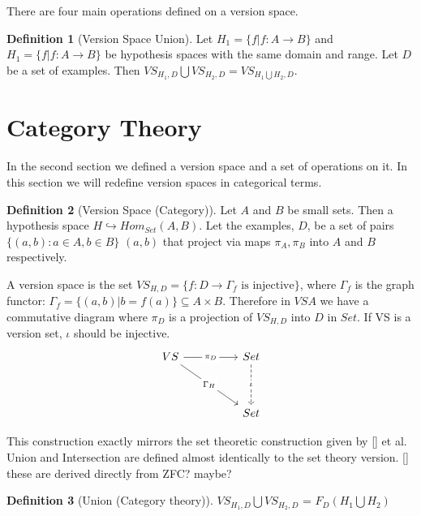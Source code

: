 \documentclass{article}
\theoremstyle{definition}
\newtheorem{definition}{Definition}[section]
\begin{document}
There are four main operations defined on a version space. 
\begin{definition}[Version Space Union]
    Let $H_1 = \{f | f: A \rightarrow B\}$ and $H_1 = \{f | f: A \rightarrow B\}$ be hypothesis spaces with the same domain and range. Let $D$ be a set of examples. Then $VS_{H_1, D} \bigcup VS_{H_2, D} = VS_{H_1\bigcup H_2, D}$. 
\end{definition}


\section{Category Theory}
In the second section we defined a version space and a set of operations on it. In this section we will redefine version spaces in categorical terms. 

\begin{definition}[Version Space (Category)]
Let $A$ and $B$ be small sets. Then a hypothesis space $H \hookrightarrow Hom_{Set}(A, B)$. Let the examples, $D$, be a set of pairs $\{(a,b) : a \in A, b \in B\}$ $(a,b)$ that project via maps $\pi_A, \pi_B$ into $A$ and $B$ respectively.

A version space is the set $VS_{H,D} = \{f : D \rightarrow \Gamma_f \text{ is injective}\}$, where $\Gamma_f$ is the graph functor: $\Gamma_f = \{(a,b) | b = f(a)\} \subseteq A\times B$. Therefore in $VSA$ we have a commutative diagram where $\pi_D$ is a projection of $VS_{H,D}$ into $D$ in $Set$. If VS is a version set, $\iota$ should be injective. 
\[\begin{tikzcd}
	{VS} && Set \\
	\\
	&& Set
	\arrow["{\pi_D}"{description}, from=1-1, to=1-3]
	\arrow["\iota"{description}, dashed, from=1-3, to=3-3]
	\arrow["{\Gamma_H}"{description}, from=1-1, to=3-3]
\end{tikzcd}\]
\end{definition}

This construction exactly mirrors the set theoretic construction given by [] et al. Union and Intersection are defined almost identically to the set theory version. [] these are derived directly from ZFC? maybe? 

\begin{definition}[Union (Category theory)]
$VS_{H_1, D} \bigcup VS_{H_2, D}$ = $F_D (H_1 \bigcup H_2)$
\end{definition}
\end{document}
